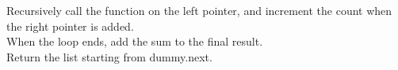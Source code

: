 \documentclass[preview]{standalone}
\begin{document}
Recursively call the function on the left pointer, and increment the count when the right pointer is added.\\When the loop ends, add the sum to the final result.\\Return the list starting from dummy.next.\\
\end{document}
